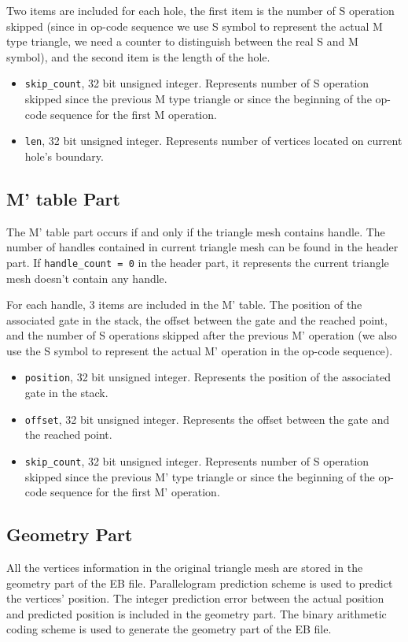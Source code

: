 \documentclass[onecolumn, 12pt]{article}
\begin{document}
Two items are included for each hole, the first item is the number of S operation skipped (since in op-code sequence we use S symbol to represent the actual M type triangle, we need a counter to distinguish between the real S and M symbol), and the second item is the length of the hole.

\begin{itemize}\itemsep=2pt
\item \lstinline !skip_count!, 32 bit unsigned integer. Represents number of S operation skipped since the previous M type triangle or since the beginning of the op-code sequence for the first M operation.
\item \lstinline !len!, 32 bit unsigned integer. Represents number of vertices located on current hole's boundary.
\end{itemize}


\subsection{M' table Part}
The M' table part occurs if and only if the triangle mesh contains handle. The number of handles contained in current triangle mesh can be found in the header part. If \lstinline !handle_count = 0! in the header part, it represents the current triangle mesh doesn't contain any handle.

For each handle, 3 items are included in the M' table. The position of the associated gate in the stack, the offset between the gate and the reached point, and the number of S operations skipped after the previous M' operation (we also use the S symbol to represent the actual M' operation in the op-code sequence).

\begin{itemize}\itemsep=2pt
\item \lstinline !position!, 32 bit unsigned integer. Represents the position of the associated gate in the stack.
\item \lstinline !offset!, 32 bit unsigned integer. Represents the offset between the gate and the reached point.
\item \lstinline !skip_count!, 32 bit unsigned integer. Represents number of S operation skipped since the previous M' type triangle or since the beginning of the op-code sequence for the first M' operation.
\end{itemize}


\subsection{Geometry Part}
All the vertices information in the original triangle mesh are stored in the geometry part of the EB file. Parallelogram prediction scheme is used to predict the vertices' position. The integer prediction error between the actual position and predicted position is included in the geometry part. The binary arithmetic coding scheme is used to generate the geometry part of the EB file.
\end{document}
